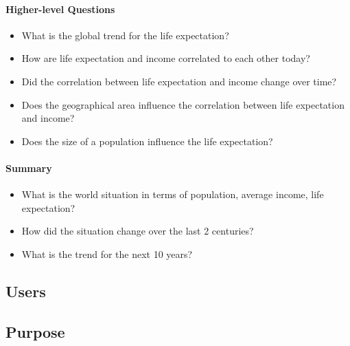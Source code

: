 \paragraph{Higher-level Questions}
\begin{itemize}

    \item What is the global trend for the life expectation?

    \item How are life expectation and income correlated to each other today?    
    \item Did the correlation between life expectation and income change over time?
    \item Does the geographical area influence the correlation between life expectation and income?
    \item Does the size of a population influence the life expectation?
    
\end{itemize}

\paragraph{Summary}
\begin{itemize}    
    \item What is the world situation in terms of population, average income, life expectation?
    \item How did the situation change over the last 2 centuries?
    \item What is the trend for the next 10 years?
\end{itemize}

\subsection{Users}


\subsection{Purpose}
